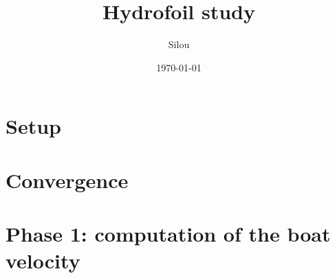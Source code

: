 \documentclass[12pt]{article}
\author{Silou}
\date{\today}
\title{Hydrofoil study}
\begin{document}
  

    \maketitle
    

    \clearpage
    \section{Setup}
    

    \clearpage
    \section{Convergence}
    

    \cleardoublepage
    \section{Phase 1: computation of the boat velocity}
    

    \clearpage
    \cite{Pavou}
    
    
\end{document}
